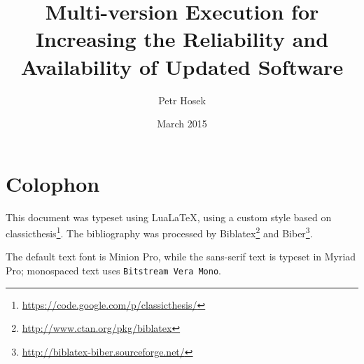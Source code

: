 \documentclass[a4paper,12pt,oneside,minionpro,dottedtoc]{thesis}
\title{Multi-version Execution for Increasing the Reliability and Availability of Updated Software}
\author{Petr Hosek}
\date{March 2015}
\begin{document}
\let\question\savedquestion

\maketitle

\null
\vfill
{}
\section*{Colophon}

This document was typeset using Lua\LaTeX, using a custom style based on
\textsf{classicthesis}\footnote{\url{https://code.google.com/p/classicthesis/}}.
The bibliography was processed by
Biblatex\footnote{\url{http://www.ctan.org/pkg/biblatex}} and
Biber\footnote{\url{http://biblatex-biber.sourceforge.net/}}.

The default text font is Minion Pro, while the sans-serif text is typeset in
\textsf{Myriad Pro}; monospaced text uses \texttt{Bitstream Vera Mono}.
\end{document}

